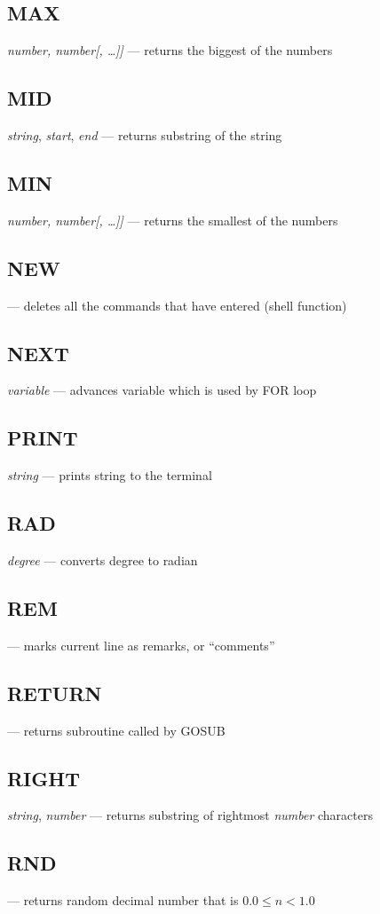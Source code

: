 \subsection{MAX} \emph{number, number[, \ldots]]} --- returns the biggest of the numbers
\subsection{MID} \emph{string}, \emph{start}, \emph{end} --- returns substring of the string
\subsection{MIN} \emph{number, number[, \ldots]]} --- returns the smallest of the numbers
\subsection{NEW} --- deletes all the commands that have entered (shell function)
\subsection{NEXT} \emph{variable} --- advances variable which is used by FOR loop
\subsection{PRINT} \emph{string} --- prints string to the terminal
\subsection{RAD} \emph{degree} --- converts degree to radian
\subsection{REM} --- marks current line as remarks, or ``comments''
\subsection{RETURN} --- returns subroutine called by GOSUB
\subsection{RIGHT} \emph{string}, \emph{number} --- returns substring of rightmost \emph{number} characters
\subsection{RND} --- returns random decimal number that is $ 0.0 \leq n < 1.0 $
